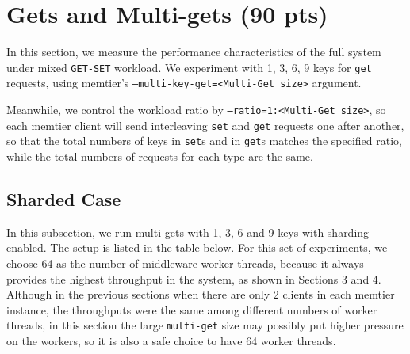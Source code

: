 \section{Gets and Multi-gets (90 pts)}

In this section, we measure the performance characteristics of the full system under mixed \texttt{GET-SET} workload. We experiment with 1, 3, 6, 9 keys for \texttt{get} requests, using memtier's \texttt{--multi-key-get=<Multi-Get size>} argument. 

Meanwhile, we control the workload ratio by \texttt{--ratio=1:<Multi-Get size>}, so each memtier client will send interleaving \texttt{set} and \texttt{get} requests one after another, so that the total numbers of keys in \texttt{set}s and in \texttt{get}s matches the specified ratio, while the total numbers of requests for each type are the same.


\subsection{Sharded Case}

In this subsection, we run multi-gets with 1, 3, 6 and 9 keys with sharding enabled. The setup is listed in the table below. For this set of experiments, we choose 64 as the number of middleware worker threads, because it always provides the highest throughput in the system, as shown in Sections 3 and 4. Although in the previous sections when there are only 2 clients in each memtier instance, the throughputs were the same among different numbers of worker threads, in this section the large \texttt{multi-get} size may possibly put higher pressure on the workers, so it is also a safe choice to have 64 worker threads.

